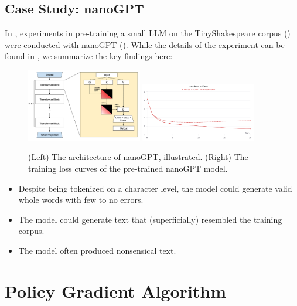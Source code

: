 \documentclass{article} %
\theoremstyle{definition}
\begin{document}
\subsection{Case Study: nanoGPT} \label{sec:cs-nanogpt}
In \cite{wk8}, experiments in pre-training a small LLM on the TinyShakespeare corpus (\cite{tinyss, tinyss2}) were
conducted with nanoGPT (\cite{nanoGPT}). While the details of the experiment can be found in \cite{wk8},
we summarize the key findings here:
\begin{figure}
    \centering
    \includegraphics[width=0.45\textwidth, height=0.15\textheight]{images/gpt_arch.png}
    \includegraphics[width=0.45\textwidth, height=0.15\textheight]{images/loss_curves.png}
    \caption{(Left) The architecture of nanoGPT, illustrated. (Right) The training loss curves of the pre-trained nanoGPT model.}
    \label{fig:nanoGPT-sample}
\end{figure}
\begin{itemize}
    \item Despite being tokenized on a character level, the model could generate valid whole words
         with few to no errors.
    \item The model could generate text that (superficially) resembled the training corpus.
    \item The model often produced nonsensical text.
\end{itemize}


\section{Policy Gradient Algorithm}
\label{sec:alg-reinforce}
\end{document}
